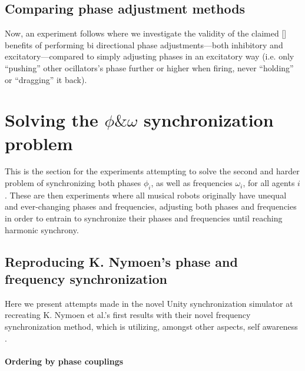 	
	\subsection{Comparing phase adjustment methods}
	Now, an experiment follows where we investigate the validity of the claimed [] benefits of performing bi directional phase adjustments—both inhibitory and excitatory—compared to simply adjusting phases in an excitatory way (i.e. only ``pushing'' other ocillators's phase further or higher when firing, never ``holding'' or ``dragging'' it back).
	
	
	
	
\section{Solving the $\phi \& \omega$ synchronization problem}
This is the section for the experiments attempting to solve the second and harder problem of synchronizing both phases $\phi_i$, as well as frequencies $\omega_i$, for all agents $i$. These are then experiments where all musical robots originally have unequal and ever-changing phases  and frequencies, adjusting both phases and frequencies in order to entrain to synchronize their phases and frequencies until reaching harmonic synchrony.

	\subsection{Reproducing K. Nymoen's phase and frequency synchronization}
	Here we present attempts made in the novel Unity synchronization simulator at recreating K. Nymoen et al.'s first results with their novel frequency synchronization method, which is utilizing, amongst other aspects, self awareness \cite{nymoen_synch}.
	
		\paragraph{Ordering by phase couplings}
		
